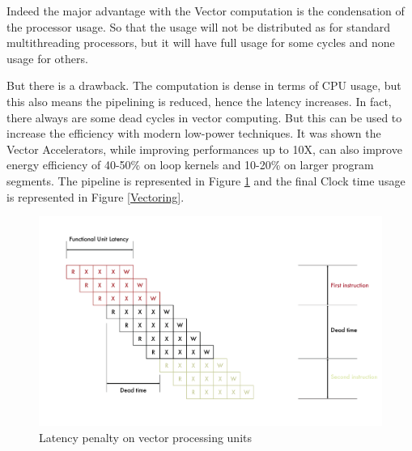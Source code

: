 Indeed the major advantage with the Vector computation is the condensation of the processor usage. 
So that the usage will not be distributed as for standard multithreading processors, but it will have full usage for some cycles and none usage for others\cite{L15-Krste}.

But there is a drawback. The computation is dense in terms of CPU usage, but this also means the pipelining is reduced, hence the latency increases. In fact, there always are some dead cycles in vector computing.
But this can be used to increase the efficiency with modern low-power techniques. It was shown \cite{Lemuet2006} the Vector Accelerators, while improving performances up to 10X, can also improve energy efficiency of 40-50\% on loop kernels and 10-20\% on larger program segments.
The pipeline is represented in Figure \ref{Vector-Latency} and the final Clock time usage is represented in Figure \ref{Vectoring}.

\begin{figure}[H]
    \centering
    \includegraphics[scale = 0.5]{Chapter_1/img/lat-pen.png}
    \caption{Latency penalty on vector processing units \cite{L15-Krste}}
    \label{Vector-Latency}
\end{figure}

